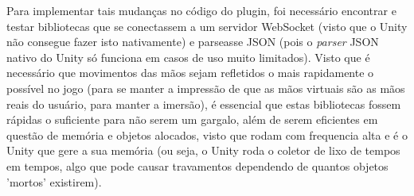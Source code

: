 Para implementar tais mudanças no código do plugin, foi necessário encontrar e testar bibliotecas que se conectassem a um servidor WebSocket (visto que o Unity não consegue fazer isto nativamente) e parseasse JSON (pois o \textit{parser} JSON nativo do Unity só funciona em casos de uso muito limitados). Visto que é necessário que movimentos das mãos sejam refletidos o mais rapidamente o possível no jogo (para se manter a impressão de que as mãos virtuais são as mãos reais do usuário, para manter a imersão), é essencial que estas bibliotecas fossem rápidas o suficiente para não serem um gargalo, além de serem eficientes em questão de memória e objetos alocados, visto que rodam com frequencia alta e é o Unity que gere a sua memória (ou seja, o Unity roda o coletor de lixo de tempos em tempos, algo que pode causar travamentos dependendo de quantos objetos 'mortos' existirem).




